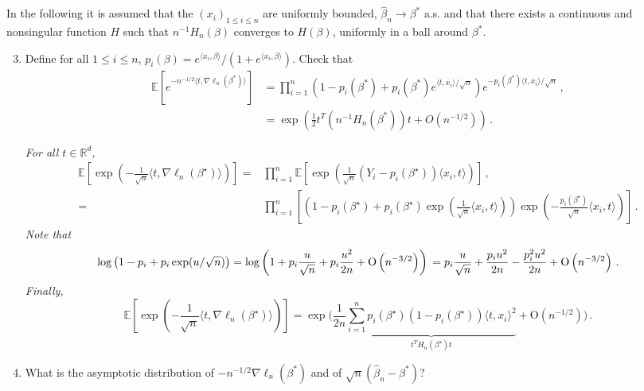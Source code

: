 \documentclass[a4paper,10pt,fleqn]{article}
\newcommand{\eqsp}{\,}
\newcommand{\rset}{\ensuremath{\mathbb{R}}}
\newcommand{\1}{\ensuremath{\mathbbm{1}}}
\newcommand{\bE}{\mathbb{E}}
\begin{document}
In the following it is assumed that the $(x_{i})_{1\leqslant i\leqslant n}$ are uniformly bounded, $\widehat \beta_n\to \beta^*$ a.s. and that there exists a continuous and nonsingular function $H$ such that $n^{-1}H_{n}(\beta)$ converges to $H(\beta)$, uniformly in a ball around $\beta^*$.
\begin{enumerate}  \setcounter{enumi}{2}
\item Define for all $1\leqslant i \leqslant n$, $p_{i}(\beta)=e^{\langle x_{i},\beta\rangle}/ \left(1+e^{\langle x_{i},\beta\rangle}\right)$. Check that
\begin{align*}
\bE \left[e^{-n^{-1/2}\langle t,\nabla\ell_{n}(\beta^*)\rangle}\right]& =\prod_{i=1}^n \left({1-p_{i}(\beta^*)+p_{i}(\beta^*)e^{\langle t,x_{i}\rangle/\sqrt{n}}}\right) e^{-p_{i}(\beta^*)\langle t,x_{i}\rangle/\sqrt{n}}\eqsp, \\
&=\exp\left(\frac{1}{2}t^T\left(n^{-1}H_{n}(\beta^*)\right)t+O(n^{-1/2})\right)\eqsp.
\end{align*}

\vspace{.2cm}

{\em
For all $t\in\rset^d$,
\begin{align*}
 \bE \left[ \exp\left( - \frac{1}{\sqrt{n}} \langle t, \nabla \ell_n(\beta^{\star}) \rangle \right) \right] = & \prod_{i=1}^n \bE \left[ \exp\left( \frac{1}{\sqrt{n}} (Y_i - p_i(\beta^{\star}) )\langle x_i, t \rangle \right) \right]\eqsp,\\
= & \prod_{i=1}^n \left[ \left( 1 - p_i(\beta^{\star}) +  p_i(\beta^{\star}) \exp\left( \frac{1}{\sqrt{n}} \langle x_i, t \rangle \right) \right) \exp \left( - \frac{ p_i(\beta^{\star})}{\sqrt{n}} \langle x_i, t \rangle \right) \right]\eqsp.
\end{align*}
Note that 
\[
\log \left( 1 - p_i + p_i \exp(u/\sqrt{n}) \right) =  \log\left( 1 + p_i \frac{u}{\sqrt{n}} + p_i \frac{u^2}{2n} + \textrm{O} \left( n^{-3/2} \right)\right)\\
 = p_i \frac{u}{\sqrt{n}} + \frac{p_i u^2}{2n} - \frac{p_i^2 u^2}{2n} + \textrm{O} \left( n^{-3/2} \right)\eqsp.
\]
Finally, 
\[
\bE \left[ \exp\left( - \frac{1}{\sqrt{n}} \langle t, \nabla \ell_n(\beta^{\star}) \rangle \right) \right] = 
\exp\Bigg( \frac{1}{2n} \underbrace{\sum_{i=1}^n p_i(\beta^{\star}) (1 - p_i(\beta^{\star})) \langle t, x_i \rangle^2}_{t^T H_n(\beta^{\star}) t} + \textrm{O}(n^{-1/2})\Bigg)\eqsp.
\]
}
\item What is the asymptotic distribution of $-n^{-1/2}\nabla\ell_{n}(\beta^*)$ and of $\sqrt{n}(\widehat \beta_n-\beta^*)$?


\end{enumerate}
\end{document}
